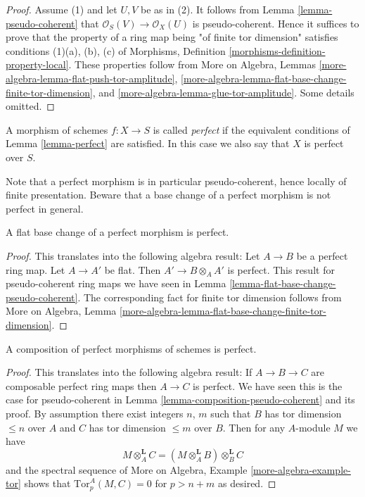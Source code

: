\begin{proof}
Assume (1) and let $U, V$ be as in (2).
It follows from
Lemma \ref{lemma-pseudo-coherent}
that $\mathcal{O}_S(V) \to \mathcal{O}_X(U)$ is pseudo-coherent.
Hence it suffices to prove that the property of a ring map
being "of finite tor dimension" satisfies
conditions (1)(a), (b), (c) of
Morphisms, Definition \ref{morphisms-definition-property-local}.
These properties follow from
More on Algebra,
Lemmas \ref{more-algebra-lemma-flat-push-tor-amplitude},
\ref{more-algebra-lemma-flat-base-change-finite-tor-dimension}, and
\ref{more-algebra-lemma-glue-tor-amplitude}.
Some details omitted.
\end{proof}

\begin{definition}
\label{definition-perfect}
A morphism of schemes $f : X \to S$ is called {\it perfect}
if the equivalent conditions of
Lemma \ref{lemma-perfect}
are satisfied. In this case we also say that $X$ is perfect
over $S$.
\end{definition}

\noindent
Note that a perfect morphism is in particular pseudo-coherent, hence
locally of finite presentation. Beware that a base change of a perfect
morphism is not perfect in general.

\begin{lemma}
\label{lemma-flat-base-change-perfect}
A flat base change of a perfect morphism is perfect.
\end{lemma}

\begin{proof}
This translates into the following algebra result:
Let $A \to B$ be a perfect ring map.
Let $A \to A'$ be flat. Then $A' \to B \otimes_A A'$ is
perfect. This result for pseudo-coherent ring maps we have seen in
Lemma \ref{lemma-flat-base-change-pseudo-coherent}.
The corresponding fact for finite tor dimension follows from
More on Algebra,
Lemma \ref{more-algebra-lemma-flat-base-change-finite-tor-dimension}.
\end{proof}

\begin{lemma}
\label{lemma-composition-perfect}
A composition of perfect morphisms of schemes is perfect.
\end{lemma}

\begin{proof}
This translates into the following algebra result:
If $A \to B \to C$ are composable perfect ring maps
then $A \to C$ is perfect. We have seen this is the case for
pseudo-coherent in
Lemma \ref{lemma-composition-pseudo-coherent}
and its proof. By assumption there exist integers $n$, $m$ such
that $B$ has tor dimension $\leq n$ over $A$ and $C$ has tor dimension
$\leq m$ over $B$. Then for any $A$-module $M$ we have
$$
M \otimes_A^{\mathbf{L}} C =
(M \otimes_A^{\mathbf{L}} B) \otimes_B^{\mathbf{L}} C
$$
and the spectral sequence of
More on Algebra, Example \ref{more-algebra-example-tor}
shows that $\text{Tor}^A_p(M, C) = 0$ for $p > n + m$ as desired.
\end{proof}

